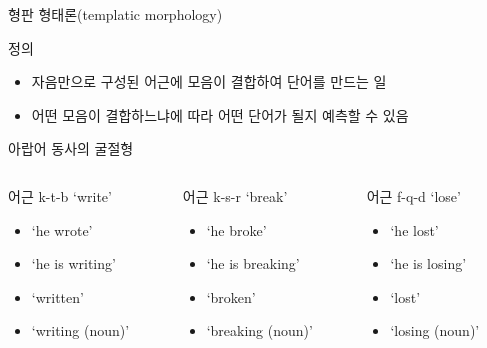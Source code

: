 \documentclass[11pt, aspectratio=169]{beamer}
\newcommand{\textds}[1]{{\ipafont #1}}
\begin{document}
\begin{frame}[t]{형판 형태론(templatic morphology)}
  \begin{block}{정의}
    \begin{itemize}
      \item 자음만으로 구성된 어근에 모음이 결합하여 단어를 만드는 일
      \item 어떤 모음이 결합하느냐에 따라 어떤 단어가 될지 예측할 수 있음
    \end{itemize}
  \end{block}
  \begin{block}{아랍어 동사의 굴절형 }
  \begin{columns}
    \begin{column}{0.3\textwidth}
      어근 k-t-b ‘write’
      \begin{itemize}
        \item \textds{[kataba]} ‘he wrote’
        \item \textds{[yaktubu]} ‘he is writing’
        \item \textds{[maktuːb]} ‘written’
        \item \textds{[katb]} ‘writing (noun)’
      \end{itemize}
    \end{column}
    \begin{column}{0.3\textwidth}
      어근 k-s-r ‘break’
      \begin{itemize}
        \item \textds{[kasara]} ‘he broke’
        \item \textds{[yaksuru]} ‘he is breaking’
        \item \textds{[maksuːr]} ‘broken’
        \item \textds{[kasr]} ‘breaking (noun)’
      \end{itemize}
    \end{column}
    \begin{column}{0.3\textwidth}
      어근 f-q-d ‘lose’
      \begin{itemize}
        \item \textds{[faqada]} ‘he lost’
        \item \textds{[yafqidu]} ‘he is losing’
        \item \textds{[mafquːd]} ‘lost’
        \item \textds{[faqd]} ‘losing (noun)’
      \end{itemize}
    \end{column}
  \end{columns}    
  \end{block}

\end{frame}
\end{document}
